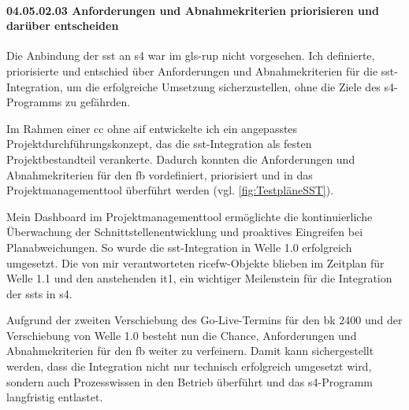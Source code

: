 \paragraph*{04.05.02.03 Anforderungen und Abnahmekriterien priorisieren und darüber entscheiden}
\label{para:04.05.02.03_AnforderungenUndAbnahmekriterienPriorisierenUndDavonEntscheiden}

\par Die Anbindung der \gls{sst} an \gls{s4} war im \gls{gls-rup} nicht vorgesehen. Ich definierte, priorisierte und entschied über Anforderungen und Abnahmekriterien für die \gls{sst}-Integration, um die erfolgreiche Umsetzung sicherzustellen, ohne die Ziele des \gls{s4}-Programms zu gefährden.

\par Im Rahmen einer \gls{cc} ohne \gls{aif} entwickelte ich ein angepasstes Projektdurchführungskonzept, das die \gls{sst}-Integration als festen Projektbestandteil verankerte. Dadurch konnten die Anforderungen und Abnahmekriterien für den \gls{fb} vordefiniert, priorisiert und in das Projektmanagementtool überführt werden (vgl. \autoref{fig:TestpläneSST}).

\par Mein Dashboard im Projektmanagementtool ermöglichte die kontinuierliche Überwachung der Schnittstellenentwicklung und proaktives Eingreifen bei Planabweichungen. So wurde die \gls{sst}-Integration in Welle 1.0 erfolgreich umgesetzt. Die von mir verantworteten \gls{ricefw}-Objekte blieben im Zeitplan für Welle 1.1 und den anstehenden \gls{it1}, ein wichtiger Meilenstein für die Integration der \gls{sst}s in \gls{s4}.

\par Aufgrund der zweiten Verschiebung des Go-Live-Termins für den \gls{bk} 2400 und der Verschiebung von Welle 1.0 besteht nun die Chance, Anforderungen und Abnahmekriterien für den \gls{fb} weiter zu verfeinern. Damit kann sichergestellt werden, dass die Integration nicht nur technisch erfolgreich umgesetzt wird, sondern auch Prozesswissen in den Betrieb überführt und das \gls{s4}-Programm langfristig entlastet.